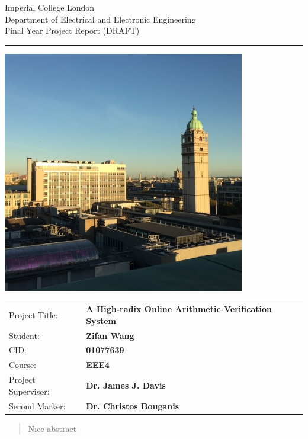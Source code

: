 \documentclass[12pt]{article}
\begin{document}
\begin{titlepage}
  \setlength{\parindent}{0pt}
  \setlength{\parskip}{0pt}

  { \Large
    Imperial College London\\[17pt]
    Department of Electrical and Electronic Engineering\\[17pt]
    Final Year Project Report (DRAFT)
  }

  \rule{\columnwidth}{3pt}
  \vfill
  \centering
  \includegraphics[width=0.7\columnwidth]{img/1.jpg}
  \vfill

  \begin{table}[h]
  \def\arraystretch{1.8}
    \begin{tabular}{p{40mm}p{\dimexpr\columnwidth-40mm}}
      Project Title: & \textbf{A High-radix Online Arithmetic Verification System} \\
      Student:       & \textbf{Zifan Wang} \\
      CID:           & \textbf{01077639} \\
      Course:        & \textbf{EEE4} \\
      Project Supervisor: & \textbf{Dr. James J. Davis} \\
      Second Marker: & \textbf{Dr. Christos Bouganis}
    \end{tabular}
  \end{table}
\end{titlepage}


\setcounter{tocdepth}{2}
\tableofcontents

\newpage

\begin{abstract}
  Nice abstract
\end{abstract}
\end{document}
